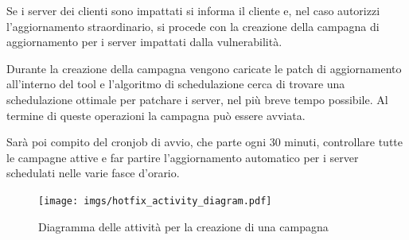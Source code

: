 Se i server dei clienti sono impattati si informa il cliente e, nel caso autorizzi 
l’aggiornamento straordinario, si procede con la creazione della campagna di 
aggiornamento per i server impattati dalla vulnerabilità.

Durante la creazione della campagna vengono caricate le patch di aggiornamento 
all’interno del tool e l’algoritmo di schedulazione cerca di trovare una 
schedulazione ottimale per patchare i server, nel più breve tempo possibile. 
Al termine di queste operazioni la campagna può essere avviata.

Sarà poi compito del cronjob di avvio, che parte ogni 30 minuti, controllare 
tutte le campagne attive e far partire l'aggiornamento automatico per i server 
schedulati nelle varie fasce d'orario.

\begin{figure}[H]
  \begin{flushright}
    \centering
    \texttt{[image: imgs/hotfix\_activity\_diagram.pdf]}
    \caption{Diagramma delle attività per la creazione di una campagna}
    \label{fig:Diagramma delle attività per la creazione di una campagna}
  \end{flushright}
\end{figure}